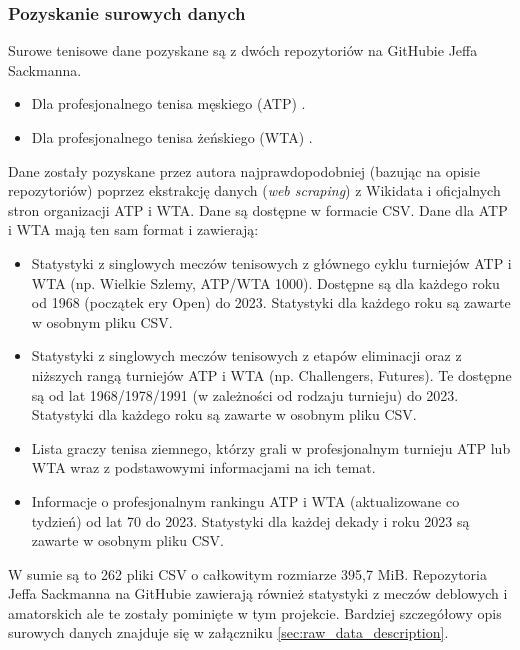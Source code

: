 \documentclass[12pt, a4paper]{article}
\begin{document}
\subsubsection{Pozyskanie surowych danych}
Surowe tenisowe dane pozyskane są z dwóch repozytoriów na GitHubie Jeffa Sackmanna.
\begin{itemize}
    \item Dla profesjonalnego tenisa męskiego (ATP) \cite{tennis_atp}.
    \item Dla profesjonalnego tenisa żeńskiego (WTA) \cite{tennis_wta}.
\end{itemize}
Dane zostały pozyskane przez autora najprawdopodobniej (bazując na opisie repozytoriów) poprzez ekstrakcję danych (\textit{web scraping}) z Wikidata i oficjalnych stron organizacji ATP i WTA. Dane są dostępne w formacie CSV. Dane dla ATP i WTA mają ten sam format i zawierają:
\begin{itemize}
    \item Statystyki z singlowych meczów tenisowych z głównego cyklu turniejów ATP i WTA (np. Wielkie Szlemy, ATP/WTA 1000). Dostępne są dla każdego roku od 1968 (początek ery Open) do 2023. Statystyki dla każdego roku są zawarte w osobnym pliku CSV.
    \item Statystyki z singlowych meczów tenisowych z etapów eliminacji oraz z niższych rangą turniejów ATP i WTA (np. Challengers, Futures). Te dostępne są od lat 1968/1978/1991 (w zależności od rodzaju turnieju) do 2023. Statystyki dla każdego roku są zawarte w osobnym pliku CSV.
    \item Lista graczy tenisa ziemnego, którzy grali w profesjonalnym turnieju ATP lub WTA wraz z podstawowymi informacjami na ich temat.
    \item Informacje o profesjonalnym rankingu ATP i WTA (aktualizowane co tydzień) od lat 70 do 2023. Statystyki dla każdej dekady i roku 2023 są zawarte w osobnym pliku CSV.
\end{itemize}
W sumie są to 262 pliki CSV o całkowitym rozmiarze 395,7 MiB. Repozytoria Jeffa Sackmanna na GitHubie zawierają również statystyki z meczów deblowych i amatorskich ale te zostały pominięte w tym projekcie. Bardziej szczegółowy opis surowych danych znajduje się w załączniku \ref{sec:raw_data_description}.


\end{document}
